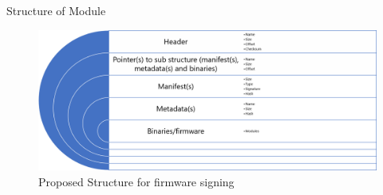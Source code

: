 \begin{frame}{Structure of Module}
    \begin{figure}[htbp]
        \centering
        \includegraphics[width=\linewidth]{Im/figures/proposed-work/proposed-structure-firmware-signing}
        \caption{Proposed Structure for firmware signing}\label{fig:proposed-work-proposed-structure-firmware-signing}
    \end{figure}
\end{frame}

